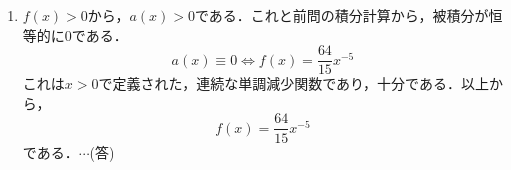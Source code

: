 \documentclass[a4j]{jarticle}
\begin{document}
\begin{multicols}{2}
\begin{enumerate}[(1)]
      \item $f(x)>0$から，$a(x)>0$である．これと前問の積分計算から，被積分が恒等的に$0$である．
           \[a(x)\equiv0\Longleftrightarrow f(x)=\frac{64}{15}x^{-5}\]
      これは$x>0$で定義された，連続な単調減少関数であり，十分である．以上から，
           \[f(x)=\frac{64}{15}x^{-5}\]
      である．$\cdots$(答)
      \end{enumerate}
\newpage
\end{multicols}
\end{document}

